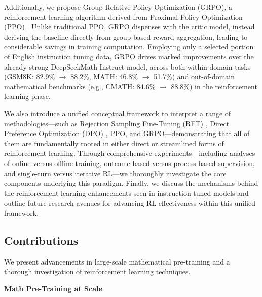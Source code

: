 Additionally, we propose Group Relative Policy Optimization (GRPO), a reinforcement learning algorithm derived from Proximal Policy Optimization (PPO) \citep{schulman2017proximal}. Unlike traditional PPO, GRPO dispenses with the critic model, instead deriving the baseline directly from group-based reward aggregation, leading to considerable savings in training computation. Employing only a selected portion of English instruction tuning data, GRPO drives marked improvements over the already strong DeepSeekMath-Instruct model, across both within-domain tasks (GSM8K: 82.9\% $\rightarrow$ 88.2\%, MATH: 46.8\% $\rightarrow$ 51.7\%) and out-of-domain mathematical benchmarks (e.g., CMATH: 84.6\% $\rightarrow$ 88.8\%) in the reinforcement learning phase. 

We also introduce a unified conceptual framework to interpret a range of methodologies—such as Rejection Sampling Fine-Tuning (RFT) \citep{yuan2023scaling}, Direct Preference Optimization (DPO) \citep{dpo}, PPO, and GRPO—demonstrating that all of them are fundamentally rooted in either direct or streamlined forms of reinforcement learning. Through comprehensive experiments—including analyses of online versus offline training, outcome-based versus process-based supervision, and single-turn versus iterative RL—we thoroughly investigate the core components underlying this paradigm. Finally, we discuss the mechanisms behind the reinforcement learning enhancements seen in instruction-tuned models and outline future research avenues for advancing RL effectiveness within this unified framework.

\subsection{Contributions}
We present advancements in large-scale mathematical pre-training and a thorough investigation of reinforcement learning techniques.

\textbf{Math Pre-Training at Scale}


